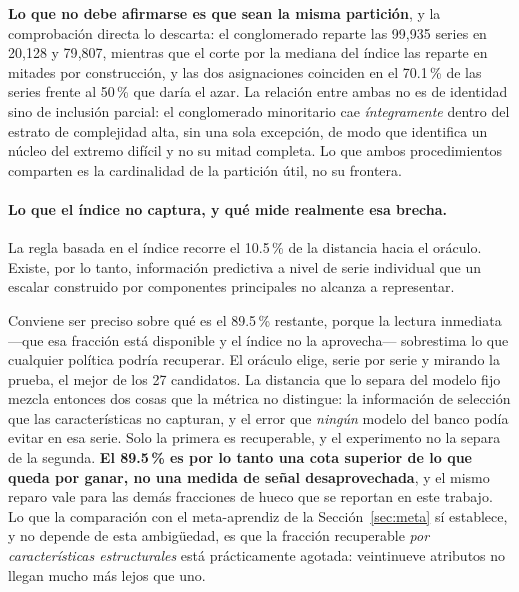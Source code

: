 \textbf{Lo que no debe afirmarse es que sean la misma partición}, y la comprobación
directa lo descarta: el conglomerado reparte las 99{,}935 series en 20{,}128 y 79{,}807,
mientras que el corte por la mediana del índice las reparte en mitades por construcción, y
las dos asignaciones coinciden en el 70.1\,\% de las series frente al 50\,\% que daría el
azar. La relación entre ambas no es de identidad sino de inclusión parcial: el
conglomerado minoritario cae \emph{íntegramente} dentro del estrato de complejidad alta,
sin una sola excepción, de modo que identifica un núcleo del extremo difícil y no su mitad
completa. Lo que ambos procedimientos comparten es la cardinalidad de la partición útil,
no su frontera.

\paragraph{Lo que el índice no captura, y qué mide realmente esa brecha.} La regla
basada en el índice recorre el 10.5\,\% de la distancia hacia el oráculo. Existe, por lo
tanto, información predictiva a nivel de serie individual que un escalar construido por
componentes principales no alcanza a representar.

Conviene ser preciso sobre qué es el 89.5\,\% restante, porque la lectura inmediata
---que esa fracción está disponible y el índice no la aprovecha--- sobrestima lo que
cualquier política podría recuperar. El oráculo elige, serie por serie y mirando la
prueba, el mejor de los 27 candidatos. La distancia que lo separa del modelo fijo mezcla
entonces dos cosas que la métrica no distingue: la información de selección que las
características no capturan, y el error que \emph{ningún} modelo del banco podía evitar
en esa serie. Solo la primera es recuperable, y el experimento no la separa de la
segunda. \textbf{El 89.5\,\% es por lo tanto una cota superior de lo que queda por
ganar, no una medida de señal desaprovechada}, y el mismo reparo vale para las demás
fracciones de hueco que se reportan en este trabajo. Lo que la comparación con el
meta-aprendiz de la Sección~\ref{sec:meta} sí establece, y no depende de esta
ambigüedad, es que la fracción recuperable \emph{por características estructurales}
está prácticamente agotada: veintinueve atributos no llegan mucho más lejos que uno.


